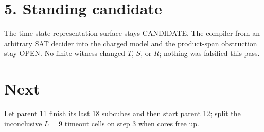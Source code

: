 \documentclass[11pt]{article}
\begin{document}
\section*{5. Standing candidate}
The time-state-representation surface stays CANDIDATE. The compiler from an arbitrary SAT decider into the charged model and the product-span obstruction stay OPEN. No finite witness changed $T$, $S$, or $R$; nothing was falsified this pass.

\section*{Next}
Let parent 11 finish its last 18 subcubes and then start parent 12; split the inconclusive $L=9$ timeout cells on step 3 when cores free up.
\end{document}
